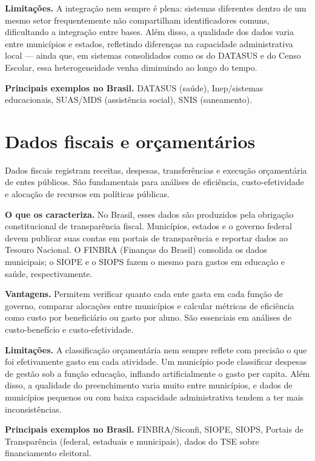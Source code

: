 \textbf{Limitações.} A integração nem sempre é plena: sistemas diferentes dentro de um mesmo setor frequentemente não compartilham identificadores comuns, dificultando a integração entre bases. Além disso, a qualidade dos dados varia entre municípios e estados, refletindo diferenças na capacidade administrativa local --- ainda que, em sistemas consolidados como os do DATASUS e do Censo Escolar, essa heterogeneidade venha diminuindo ao longo do tempo.

\textbf{Principais exemplos no Brasil.} DATASUS (saúde), Inep/sistemas educacionais, SUAS/MDS (assistência social), SNIS (saneamento).

\section{Dados fiscais e orçamentários}

Dados fiscais registram receitas, despesas, transferências e execução orçamentária de entes públicos. São fundamentais para análises de eficiência, custo-efetividade e alocação de recursos em políticas públicas.

\textbf{O que os caracteriza.} No Brasil, esses dados são produzidos pela obrigação constitucional de transparência fiscal. Municípios, estados e o governo federal devem publicar suas contas em portais de transparência e reportar dados ao Tesouro Nacional. O FINBRA (Finanças do Brasil) consolida os dados municipais; o SIOPE e o SIOPS fazem o mesmo para gastos em educação e saúde, respectivamente.

\textbf{Vantagens.} Permitem verificar quanto cada ente gasta em cada função de governo, comparar alocações entre municípios e calcular métricas de eficiência como custo por beneficiário ou gasto por aluno. São essenciais em análises de custo-benefício e custo-efetividade.

\textbf{Limitações.} A classificação orçamentária nem sempre reflete com precisão o que foi efetivamente gasto em cada atividade. Um município pode classificar despesas de gestão sob a função educação, inflando artificialmente o gasto per capita. Além disso, a qualidade do preenchimento varia muito entre municípios, e dados de municípios pequenos ou com baixa capacidade administrativa tendem a ter mais inconsistências.

\textbf{Principais exemplos no Brasil.} FINBRA/Siconfi, SIOPE, SIOPS, Portais de Transparência (federal, estaduais e municipais), dados do TSE sobre financiamento eleitoral.

